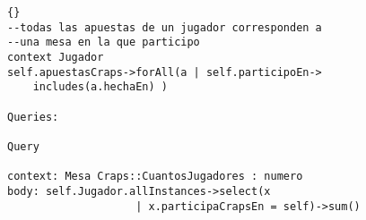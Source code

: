 \begin{framed}
\begin{lstlisting}[frame=trbl]{}
--todas las apuestas de un jugador corresponden a 
--una mesa en la que participo
context Jugador
self.apuestasCraps->forAll(a | self.participoEn->
    includes(a.hechaEn) )

Queries:

Query

context: Mesa Craps::CuantosJugadores : numero
body: self.Jugador.allInstances->select(x 
					| x.participaCrapsEn = self)->sum() 



\end{lstlisting}
\end{framed}

